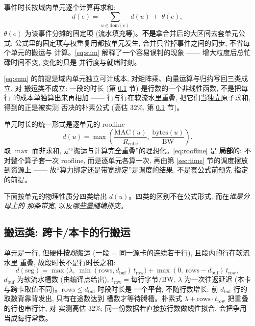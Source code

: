 \documentclass[11pt,a4paper]{article}
\newcommand{\BW}{\mathrm{BW}}
\newcommand{\MAC}{\mathrm{MAC}}
\newcommand{\dom}{\mathrm{dom}}
\begin{document}
事件时长按域内单元逐个计算再求和:
\begin{equation}
d(e) = \sum_{u \in \dom(e)} d(u) \ +\ \theta(e),
\label{eq:sum}
\end{equation}
$\theta(e)$ 为该事件分摊的固定项 (流水填充等)。\textbf{不是}拿合并后的大区间去套单元公式:
公式里的固定项与权重复用都按单元发生, 合并只省掉事件之间的同步, 不省每个单元的搬运与
计算。\eqref{eq:sum} 解释了一个容易误判的现象 —— 增大粒度后总忙碌时间不变, 变化的只是
并行度与就绪时刻。

\eqref{eq:sum} 的前提是域内单元独立可计成本, 对矩阵乘、向量运算与归约写回三类成立, 对
搬运类不成立: 一段的时长 (第 \ref{sec:f-dispatch} 节) 是行数的一个非线性函数, 不是把每行
的成本单独算出来再相加 —— 行与行在软流水里重叠, 把它们当独立原子求和, 得到的正是被实测
否决的朴素公式 (高估 32\%, 第 \ref{sec:f-dispatch} 节)。

单元时长的统一形式是逐单元的 roofline
\begin{equation}
d(u) = \max\left(\frac{\MAC(u)}{R_{\text{cube}}},\ \frac{\mathrm{bytes}(u)}{\BW}\right).
\label{eq:roofline}
\end{equation}
取 $\max$ 而非求和, 是``搬运与计算完全重叠''的理想化。\eqref{eq:roofline} 是
\textbf{局部}的: 不对整个算子套一次 roofline, 而是逐单元各算一次, 再由第 \ref{sec:time}
节的调度摆放到资源上 —— 故``算力绑定还是带宽绑定''是调度的结果, 不是套公式前预先
指定的前提。

下面按单元的物理性质分四类给出 $d(u)$。四类的区别不在公式形式, 而在\emph{谁是分母上的
那条带宽}, 以及\emph{哪些量随编排变}。

\subsection{搬运类: 跨卡/本卡的行搬运}
\label{sec:f-dispatch}

单元是一行, 但硬件按\emph{段}搬运 (一段 = 同一源卡的连续若干行), 且段内的行在软流水里
重叠, 故段时长不是行时长之和:
\begin{equation}
d(\text{seg}) = \max\!\big(\lambda,\ \min(\text{rows}, d_{\text{buf}})\, t_{\text{row}}\big)
              + \max(0,\ \text{rows}-d_{\text{buf}})\, t_{\text{row}} ,
\label{eq:dispatch}
\end{equation}
$d_{\text{buf}}$ 为软流水槽数 (由编译点给出), $t_{\text{row}} = \text{每行字节}/\BW$,
$\lambda$ 为一次往返延迟 (本卡与跨卡取值不同)。$\text{rows}\le d_{\text{buf}}$ 时段时长是
一个\textbf{平台}, 不随行数增长: 前 $d_{\text{buf}}$ 行的取数背靠背发出, 只有在途数达到
槽数才等待腾槽。朴素式 $\lambda + \text{rows}\cdot t_{\text{row}}$ 把重叠的行也串行计, 对
实测高估 32\%; 同一份数据若直接按行数做线性拟合, 会把争用当成每行常数。
\end{document}
